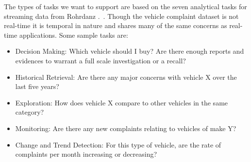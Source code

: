 

The types of tasks we want to support are based on the seven analytical tasks for streaming 
data from Rohrdanz \etal.~\cite{ROH2011a}. Though the vehicle complaint dataset is not real-time it is temporal in nature
and shares many of the same concerns as real-time applications. Some sample 
tasks are:

\begin{itemize}[noitemsep]
   \item Decision Making: Which vehicle should I buy? Are there enough
   reports and evidences to warrant a full scale investigation or a recall?
   \item Historical Retrieval: Are there any major concerns with vehicle X over the last five years?
   \item Exploration: How does vehicle X compare to other vehicles in the same category?
   \item Monitoring: Are there any new complaints relating to vehicles of make Y?
   \item Change and Trend Detection: For this type of vehicle, are the rate of complaints per month increasing or decreasing?
\end{itemize}


